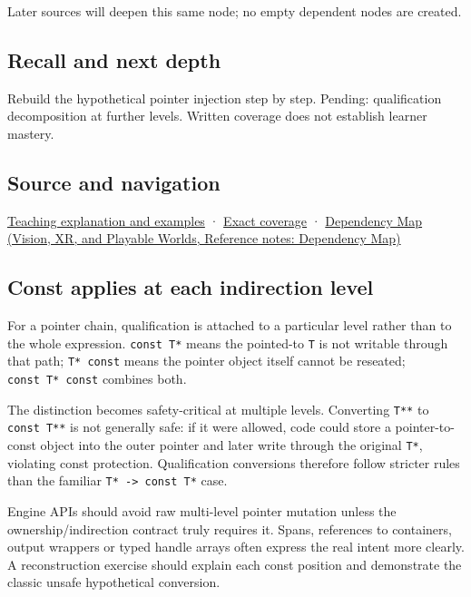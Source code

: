 Later sources will deepen this same node; no empty dependent nodes are created.

\subsection{Recall and next depth}\label{appendix-5e1a7561cd98-recall-and-next-depth}

\hypertarget{appendix-5e1a7561cd98-recall-and-next-depth}{}

Rebuild the hypothetical pointer injection step by step. Pending: qualification decomposition at further levels. Written coverage does not establish learner mastery.

\subsection{Source and navigation}\label{appendix-5e1a7561cd98-source-and-navigation}

\hypertarget{appendix-5e1a7561cd98-source-and-navigation}{}

\hyperref[01-foundations-i-ch003-read-only-is-a-path-not-an-ownership-or-synchronization-promise]{Teaching explanation and examples} · \hyperref[appendix-fd090d982a15-m008---parts-113-126]{Exact coverage} · \href{../07-Vision-XR-and-Playable-Worlds/main.pdf\#nameddest=appendix-4ad47bdd269a}{Dependency Map (Vision, XR, and Playable Worlds, Reference notes: Dependency Map)}

\subsection{Const applies at each indirection level}\label{appendix-5e1a7561cd98-const-applies-at-each-indirection-level}

\hypertarget{appendix-5e1a7561cd98-const-applies-at-each-indirection-level}{}

For a pointer chain, qualification is attached to a particular level rather than to the whole expression. \texttt{const\ T*} means the pointed-to \texttt{T} is not writable through that path; \texttt{T*\ const} means the pointer object itself cannot be reseated; \texttt{const\ T*\ const} combines both.

The distinction becomes safety-critical at multiple levels. Converting \texttt{T**} to \texttt{const\ T**} is not generally safe: if it were allowed, code could store a pointer-to-const object into the outer pointer and later write through the original \texttt{T*}, violating const protection. Qualification conversions therefore follow stricter rules than the familiar \texttt{T*\ -\textgreater{}\ const\ T*} case.

Engine APIs should avoid raw multi-level pointer mutation unless the ownership/indirection contract truly requires it. Spans, references to containers, output wrappers or typed handle arrays often express the real intent more clearly. A reconstruction exercise should explain each const position and demonstrate the classic unsafe hypothetical conversion.
